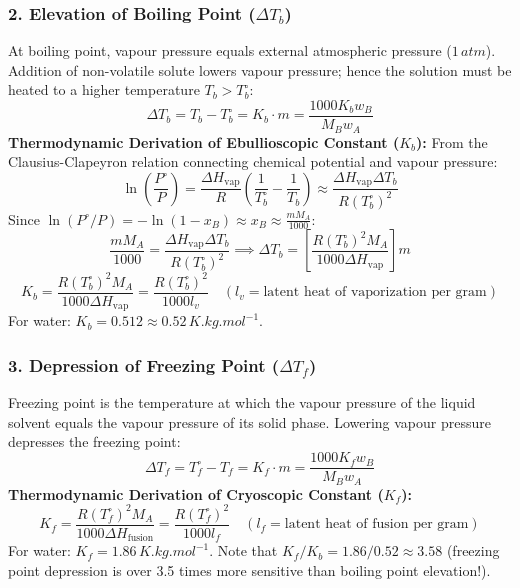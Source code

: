 \documentclass[10pt,a4paper]{article}
\begin{document}
\subsubsection{2. Elevation of Boiling Point ($\Delta T_b$)}
At boiling point, vapour pressure equals external atmospheric pressure ($1\,\si{atm}$). Addition of non-volatile solute lowers vapour pressure; hence the solution must be heated to a higher temperature $T_b > T_b^\circ$:
\begin{equation}
  \Delta T_b = T_b - T_b^\circ = K_b \cdot m = \frac{1000 K_b w_B}{M_B w_A}
\end{equation}
\textbf{Thermodynamic Derivation of Ebullioscopic Constant ($K_b$):}
From the Clausius-Clapeyron relation connecting chemical potential and vapour pressure:
\begin{equation}
  \ln\left(\frac{P^\circ}{P}\right) = \frac{\Delta H_{\text{vap}}}{R}\left(\frac{1}{T_b^\circ} - \frac{1}{T_b}\right) \approx \frac{\Delta H_{\text{vap}} \Delta T_b}{R (T_b^\circ)^2}
\end{equation}
Since $\ln(P^\circ / P) = -\ln(1 - x_B) \approx x_B \approx \frac{m M_A}{1000}$:
\begin{equation}
  \frac{m M_A}{1000} = \frac{\Delta H_{\text{vap}} \Delta T_b}{R (T_b^\circ)^2} \implies \Delta T_b = \left[\frac{R (T_b^\circ)^2 M_A}{1000 \Delta H_{\text{vap}}}\right] m
\end{equation}
\begin{equation}
  K_b = \frac{R (T_b^\circ)^2 M_A}{1000 \Delta H_{\text{vap}}} = \frac{R (T_b^\circ)^2}{1000 l_v} \quad (l_v = \text{latent heat of vaporization per gram})
\end{equation}
For water: $K_b = 0.512 \approx 0.52\,\si{K.kg.mol^{-1}}$.

\subsubsection{3. Depression of Freezing Point ($\Delta T_f$)}
Freezing point is the temperature at which the vapour pressure of the liquid solvent equals the vapour pressure of its solid phase. Lowering vapour pressure depresses the freezing point:
\begin{equation}
  \Delta T_f = T_f^\circ - T_f = K_f \cdot m = \frac{1000 K_f w_B}{M_B w_A}
\end{equation}
\textbf{Thermodynamic Derivation of Cryoscopic Constant ($K_f$):}
\begin{equation}
  K_f = \frac{R (T_f^\circ)^2 M_A}{1000 \Delta H_{\text{fusion}}} = \frac{R (T_f^\circ)^2}{1000 l_f} \quad (l_f = \text{latent heat of fusion per gram})
\end{equation}
For water: $K_f = 1.86\,\si{K.kg.mol^{-1}}$. Note that $K_f / K_b = 1.86 / 0.52 \approx 3.58$ (freezing point depression is over 3.5 times more sensitive than boiling point elevation!).
\end{document}
